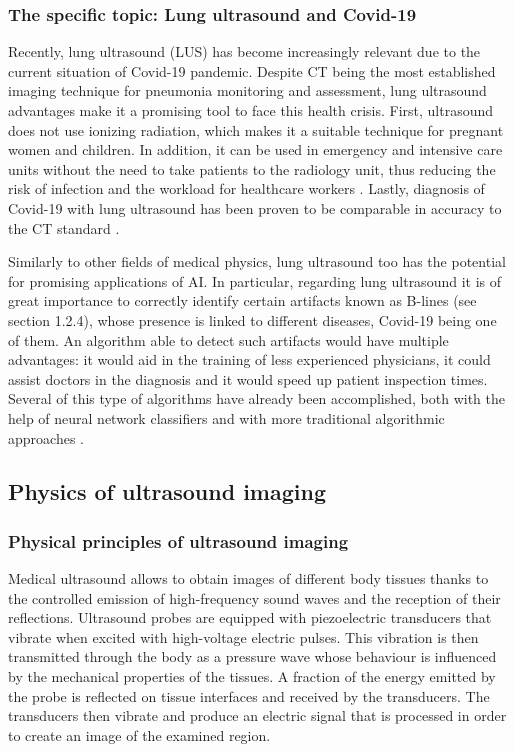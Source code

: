 \documentclass[11pt]{article} %
\begin{document}
\subsubsection{The specific topic: Lung ultrasound and Covid-19}
	Recently, lung ultrasound (LUS) has become increasingly relevant due to the current situation of Covid-19 pandemic. Despite CT being the most established imaging technique for pneumonia monitoring and assessment, lung ultrasound advantages make it a promising tool to face this health crisis. First, ultrasound does not use ionizing radiation, which makes it a suitable technique for pregnant women and children. In addition, it can be used in emergency and intensive care units without the need to take patients to the radiology unit, thus reducing the risk of infection and the workload for healthcare workers \cite{allinovi}. Lastly, diagnosis of Covid-19 with lung ultrasound has been proven to be comparable in accuracy to the CT standard \cite{ottaviani}.
	

	Similarly to other fields of medical physics, lung ultrasound too has the potential for promising applications of AI. In particular, regarding lung ultrasound it is of great importance to correctly identify certain artifacts known as B-lines (see section 1.2.4), whose presence is linked to different diseases, Covid-19 being one of them. An algorithm able to detect such artifacts would have multiple advantages: it would aid in the training of less experienced physicians, it could assist doctors in the diagnosis and it would speed up patient inspection times. Several of this type of algorithms have already been accomplished, both with the help of neural network classifiers \cite{vanSloun}\cite{born2020pocovid}\cite{cristiana2020automated}\cite{roy2020deep} and with more traditional algorithmic approaches \cite{brattain}\cite{moshavegh}.
	
	
\subsection{Physics of ultrasound imaging}
\subsubsection{Physical principles of ultrasound imaging}


	Medical ultrasound allows to obtain images of different body tissues thanks to the controlled emission of high-frequency sound waves and the reception of their reflections. Ultrasound probes are equipped with piezoelectric transducers that vibrate when excited with high-voltage electric pulses. This vibration is then transmitted through the body as a pressure wave whose behaviour is influenced by the mechanical properties of the tissues. A fraction of the energy emitted by the probe is reflected on tissue interfaces and received by the transducers. The transducers then vibrate and produce an electric signal that is processed in order to create an image of the examined region. 
	
\end{document}
